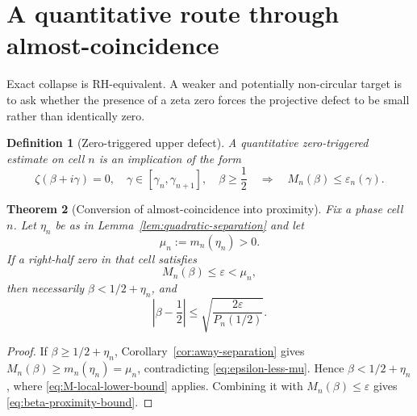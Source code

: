 \documentclass[11pt]{amsart}
\numberwithin{equation}{section}
\newtheorem{theorem}{Theorem}[section]
\newtheorem{definition}[theorem]{Definition}
\begin{document}
\section{A quantitative route through almost-coincidence}
\label{sec:quantitative-route}

Exact collapse is RH-equivalent.  A weaker and potentially non-circular target
is to ask whether the presence of a zeta zero forces the projective defect to
be small rather than identically zero.

\begin{definition}[Zero-triggered upper defect]
\label{def:zero-upper-defect}
A quantitative zero-triggered estimate on cell $n$ is an implication of the
form
\begin{equation}
 \boxed{
 \zeta(\beta+i\gamma)=0,
 \quad
 \gamma\in[\gamma_n,\gamma_{n+1}],
 \quad
 \beta\geq\frac12
 \quad\Longrightarrow\quad
 M_n(\beta)\leq\varepsilon_n(\gamma).
 }
 \label{eq:zero-upper-defect}
\end{equation}
\end{definition}

\begin{theorem}[Conversion of almost-coincidence into proximity]
\label{thm:almost-collapse-proximity}
Fix a phase cell $n$.  Let $\eta_n$ be as in
Lemma~\ref{lem:quadratic-separation} and let
\begin{equation}
 \mu_n:=m_n(\eta_n)>0.
 \label{eq:mu-n}
\end{equation}
If a right-half zero in that cell satisfies
\begin{equation}
 M_n(\beta)\leq\varepsilon<\mu_n,
 \label{eq:epsilon-less-mu}
\end{equation}
then necessarily $\beta<1/2+\eta_n$, and
\begin{equation}
 \boxed{
 \left|\beta-\frac12\right|
 \leq
 \sqrt{\frac{2\varepsilon}{P_n(1/2)}}.
 }
 \label{eq:beta-proximity-bound}
\end{equation}
\end{theorem}

\begin{proof}
If $\beta\geq1/2+\eta_n$, Corollary~\ref{cor:away-separation} gives
$M_n(\beta)\geq m_n(\eta_n)=\mu_n$, contradicting
\eqref{eq:epsilon-less-mu}.  Hence $\beta<1/2+\eta_n$, where
\eqref{eq:M-local-lower-bound} applies.  Combining it with
$M_n(\beta)\leq\varepsilon$ gives \eqref{eq:beta-proximity-bound}.
\end{proof}
\end{document}
